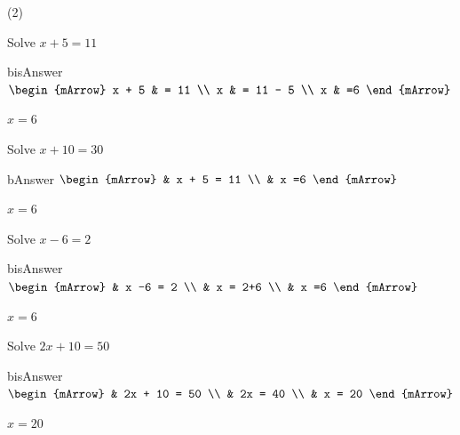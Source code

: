 \begin{mtask}(2)
   \task \begin{exercise} Solve  $ x+5 = 11 $
           \begin{envOut}[height=5cm]{bisAnswer}
             $\begin{mArrow}			 
			        x + 5 & = 11             \\
			        x     & = 11 - 5             \\
                    x     & =6                   
              \end{mArrow}$
            \begin{shortsolution}  
			     $x=6$
			\end{shortsolution}				 
           \end{envOut}
         \end{exercise}
		 
   \task \begin{exercise} Solve  $ x+ 10 = 30 $
           \begin{envOut}[height=5cm]{bAnswer}
             $\begin{mArrow} 
			       & x + 5 = 11             \\
                   & x =6                   
              \end{mArrow}$
            \begin{shortsolution}  
			     $x=6$
			\end{shortsolution}				 
           \end{envOut}
         \end{exercise}

   \task \begin{exercise} Solve  $ x-6 = 2 $
           \begin{envOut}[height=5cm]{bisAnswer}
             $\begin{mArrow}			 
			        & x -6  = 2             \\
			        & x      = 2+6          \\
                    & x      =6                   
              \end{mArrow}$
            \begin{shortsolution}  
			     $x=6$
			\end{shortsolution}				 
           \end{envOut}
         \end{exercise}


   \task \begin{exercise} Solve  $ 2x+ 10 = 50 $
           \begin{envOut}[height=5cm]{bisAnswer}
             $\begin{mArrow} 
			       & 2x + 10 = 50             \\
                   & 2x = 40                  \\
				   & x = 20
              \end{mArrow}$
            \begin{shortsolution}  
			     $x=20$
			\end{shortsolution}				 
           \end{envOut}
         \end{exercise}
		 

\end{mtask}
